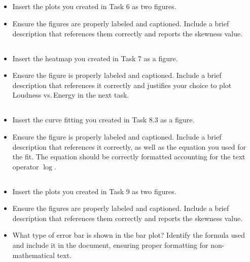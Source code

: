 \documentclass[
	german,
	accentcolor=9c,%
	type=intern,
	marginpar=false
	]{tudapub}
\begin{document}
\subsection{}
\begin{itemize}
\item Insert the plots you created in Task 6 as two figures.
\item Ensure the figures are properly labeled and captioned. Include a brief description that references them correctly and reports the skewness value.
\end{itemize}

\subsection{}
\begin{itemize}
\item Insert the heatmap you created in Task 7 as a figure. 
\item Ensure the figure is properly labeled and captioned. Include a brief description that references it correctly and justifies your choice to plot Loudness vs.\,Energy in the next task. 
\end{itemize}

\subsection{}
\begin{itemize}
\item Insert the curve fitting you created in Task 8.3 as a figure. 
\item Ensure the figure is properly labeled and captioned. Include a brief description that references it correctly, as well as the equation you used for the fit. The equation should be correctly formatted accounting for the text operator $\log$.
\end{itemize}

\subsection{}
\begin{itemize}
\item Insert the plots you created in Task 9 as two figures. 
\item Ensure the figures are properly labeled and captioned. Include a brief description that references them correctly and reports the skewness value.
\item What type of error bar is shown in the bar plot? Identify the formula used and include it in the document, ensuring proper formatting for non-mathematical text.
\end{itemize}
\end{document}
